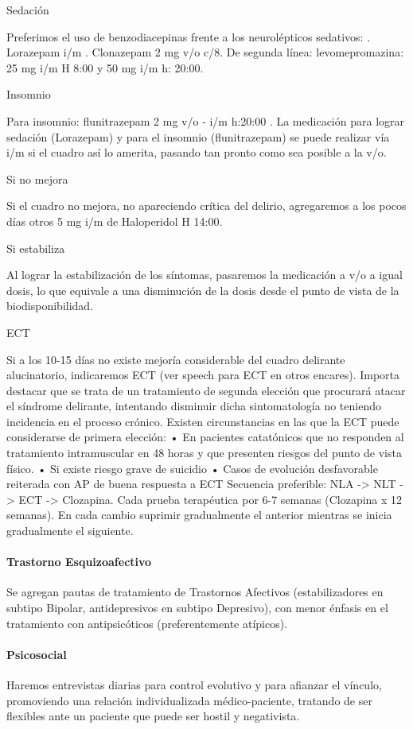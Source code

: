 Sedación

Preferimos el uso de benzodiacepinas frente a los neurolépticos sedativos: . Lorazepam i/m . Clonazepam 2 mg v/o c/8. De segunda línea: levomepromazina: 25 mg i/m H 8:00 y 50 mg i/m h: 20:00.

Insomnio

Para insomnio: flunitrazepam 2 mg v/o - i/m h:20:00 . La medicación para lograr sedación (Lorazepam) y para el insomnio (flunitrazepam) se puede realizar vía i/m si el cuadro así lo amerita, pasando tan pronto como sea posible a la v/o.

Si no mejora

Si el cuadro no mejora, no apareciendo crítica del delirio, agregaremos a los pocos días otros 5 mg i/m de Haloperidol H 14:00.

Si estabiliza

Al lograr la estabilización de los síntomas, pasaremos la medicación a v/o a igual dosis, lo que equivale a una disminución de la dosis desde el punto de vista de la biodisponibilidad.

ECT

Si a los 10-15 días no existe mejoría considerable del cuadro delirante alucinatorio, indicaremos ECT (ver speech para ECT en otros encares). Importa destacar que se trata de un tratamiento de segunda elección que procurará atacar el síndrome delirante, intentando disminuir dicha sintomatología no teniendo incidencia en el proceso crónico. Existen circunstancias en las que la ECT puede considerarse de primera elección: • En pacientes catatónicos que no responden al tratamiento intramuscular en 48 horas y que presenten riesgos del punto de vista físico. • Si existe riesgo grave de suicidio • Casos de evolución desfavorable reiterada con AP de buena respuesta a ECT Secuencia preferible: NLA -> NLT -> ECT -> Clozapina. Cada prueba terapéutica por 6-7 semanas (Clozapina x 12 semanas). En cada cambio suprimir gradualmente el anterior mientras se inicia gradualmente el siguiente.

\paragraph{Trastorno Esquizoafectivo}
Se agregan pautas de tratamiento de Trastornos Afectivos (estabilizadores en subtipo Bipolar, antidepresivos en subtipo Depresivo), con menor énfasis en el tratamiento con antipsicóticos (preferentemente atípicos).

\paragraph*{Psicosocial}
Haremos entrevistas diarias para control evolutivo y para afianzar el vínculo, promoviendo una relación individualizada médico-paciente, tratando de ser flexibles ante un paciente que puede ser hostil y negativista.

